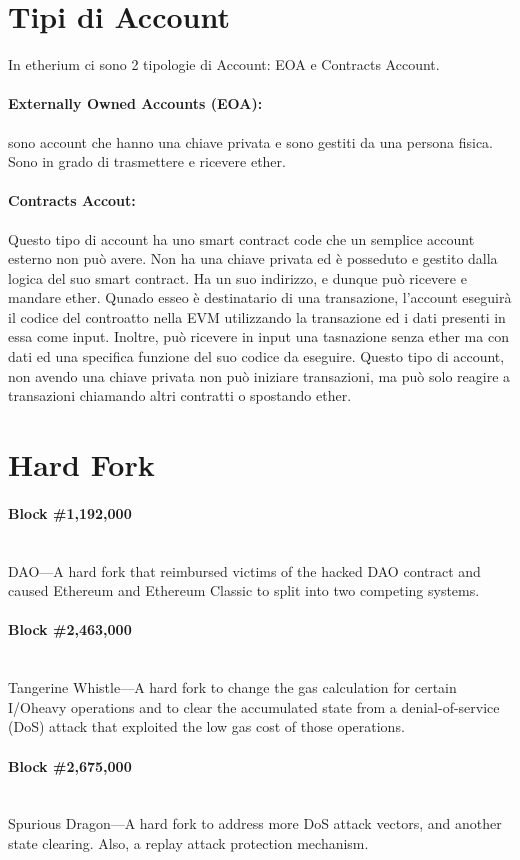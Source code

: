 \section{Tipi di Account}
In etherium ci sono 2 tipologie di Account: EOA e Contracts Account.

\paragraph{Externally Owned Accounts (EOA):}
sono account che hanno una chiave privata e sono gestiti da una persona fisica.
Sono in grado di trasmettere e ricevere ether.

\paragraph{Contracts Accout:}
Questo tipo di account ha uno smart contract code che un semplice account esterno non può avere.
Non ha una chiave privata ed è posseduto e gestito dalla logica del suo smart contract.
Ha un suo indirizzo, e dunque può ricevere e mandare ether.
Qunado esseo è destinatario di una transazione, l'account eseguirà il codice del controatto
nella EVM utilizzando la transazione ed i dati presenti in essa come input.
Inoltre, può ricevere in input una tasnazione senza ether ma con dati ed una specifica
funzione del suo codice da eseguire. Questo tipo di account, non avendo una chiave privata
non può iniziare transazioni, ma può solo reagire a transazioni chiamando altri contratti o
spostando ether.

\section{Hard Fork}

\paragraph{Block \#1,192,000} \ \\
DAO—A hard fork that reimbursed victims of the hacked DAO contract and
caused Ethereum and Ethereum Classic to split into two competing systems.

\paragraph{Block \#2,463,000} \ \\
Tangerine Whistle—A hard fork to change the gas calculation for certain I/Oheavy operations and to clear the accumulated state from a denial-of-service
(DoS) attack that exploited the low gas cost of those operations.

\paragraph{Block \#2,675,000} \ \\
Spurious Dragon—A hard fork to address more DoS attack vectors, and another
state clearing. Also, a replay attack protection mechanism.